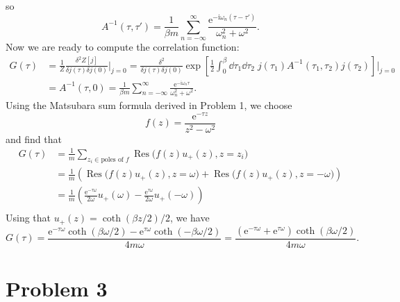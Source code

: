 \documentclass{article}
\newcommand{\ii}{\mathrm{i}}
\newcommand{\me}{\mathrm{e}}
\begin{document}
so
\begin{equation}
    A^{-1}(\tau,\tau') = \frac{1}{\beta m} \sum_{n=-\infty}^{\infty} \frac{\me^{-\ii \omega_n (\tau-\tau')}}{\omega_n^2 + \omega^2}.
\end{equation}
Now we are ready to compute the correlation function:
\begin{equation}
    \begin{split}
        G(\tau) & =\frac{1}{Z}\frac{\delta^2 Z[j]}{\delta j(\tau)\delta j(0)}\Bigg|_{j=0} = \frac{\delta^2}{\delta j(\tau)\delta j(0)} \exp\left[\frac{1}{2}\int_0^{\beta} \dd{\tau_1} \dd{\tau_2} \; j(\tau_1) A^{-1}(\tau_1,\tau_2) j(\tau_2)\right]\Bigg|_{j=0} \\
                & =A^{-1}(\tau,0) = \frac{1}{\beta m} \sum_{n=-\infty}^{\infty} \frac{\me^{-\ii \omega_n \tau}}{\omega_n^2 + \omega^2}.
    \end{split}
\end{equation}
Using the Matsubara sum formula derived in Problem 1, we choose 
\begin{equation}
    f(z) = \frac{\me^{-\tau z}}{z^2 - \omega^2}
\end{equation}
and find that
\begin{equation}
    \begin{split}
        G(\tau) &= \frac{1}{m}\sum_{z_i\in\text{poles of }f} \operatorname*{Res}\big(f(z)u_+(z), z=z_i\big)\\
                &= \frac{1}{m}(\operatorname*{Res}\big(f(z)u_+(z), z=\omega\big) + \operatorname*{Res}\big(f(z)u_+(z), z=-\omega\big))\\
                &= \frac{1}{m}\left(\frac{\me^{-\tau \omega}}{2\omega}u_+(\omega) - \frac{\me^{\tau \omega}}{2\omega}u_+(-\omega)\right)\\
    \end{split}
\end{equation}
Using that $u_+(z)=\coth(\beta z/2)/2$, we have 
\begin{equation}
    G(\tau) = \frac{\me^{-\tau\omega}\coth(\beta\omega/2)-\me^{\tau\omega}\coth(-\beta\omega/2)}{4m\omega}=\frac{(\me^{-\tau\omega}+\me^{\tau\omega})\coth(\beta\omega/2)}{4m\omega}.
\end{equation}


\section*{Problem 3}
\end{document}
